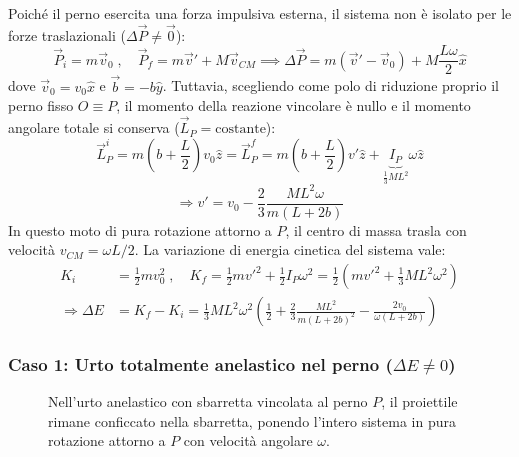 Poiché il perno esercita una forza impulsiva esterna, il sistema non è isolato per le forze traslazionali ($\Delta \vec{P} \neq \vec{0}$):
\begin{equation}
    \vec{P}_i = m\vec{v}_0 \; , \quad \vec{P}_f = m\vec{v}' + M\vec{v}_{CM} \implies \Delta \vec{P} = m(\vec{v}' - \vec{v}_0) + M \frac{L \omega}{2} \hat{x}
\end{equation}
dove $\vec{v}_0 = v_0 \hat{x}$ e $\vec{b} = -b \hat{y}$.
Tuttavia, scegliendo come polo di riduzione proprio il perno fisso $O \equiv P$, il momento della reazione vincolare è nullo e il momento angolare totale si conserva ($\vec{L}_P = \text{costante}$):
\begin{equation}
    \vec{L}_P^i = m\left(b + \frac{L}{2}\right) v_0 \hat{z} = \vec{L}_P^f = m\left(b + \frac{L}{2}\right) v' \hat{z} + \underbrace{I_P}_{\frac{1}{3}ML^2} \omega \hat{z}
\end{equation}
\begin{equation}
    \Rightarrow v' = v_0 - \frac{2}{3} \frac{M L^2 \omega}{m(L+2b)}
\end{equation}
In questo moto di pura rotazione attorno a $P$, il centro di massa trasla con velocità $v_{CM} = \omega L / 2$. La variazione di energia cinetica del sistema vale:
\begin{align*}
K_i &= \frac{1}{2} m v_0^2 \; , \quad K_f = \frac{1}{2} m v'^2 + \frac{1}{2} I_P \omega^2 = \frac{1}{2} \left( m v'^2 + \frac{1}{3} M L^2 \omega^2 \right) \\
\Rightarrow \Delta E &= K_f - K_i = \frac{1}{3} M L^2 \omega^2 \left( \frac{1}{2} + \frac{2}{3} \frac{M L^2}{m(L+2b)^2} - \frac{2 v_0}{\omega(L+2b)} \right)
\end{align*}

\subsubsection{Caso 1: Urto totalmente anelastico nel perno ($\Delta E \neq 0$)}
\begin{figure}[ht]
\centering
{}
\caption{Nell'urto anelastico con sbarretta vincolata al perno $P$, il proiettile rimane conficcato nella sbarretta, ponendo l'intero sistema in pura rotazione attorno a $P$ con velocità angolare $\omega$.}
\end{figure}

